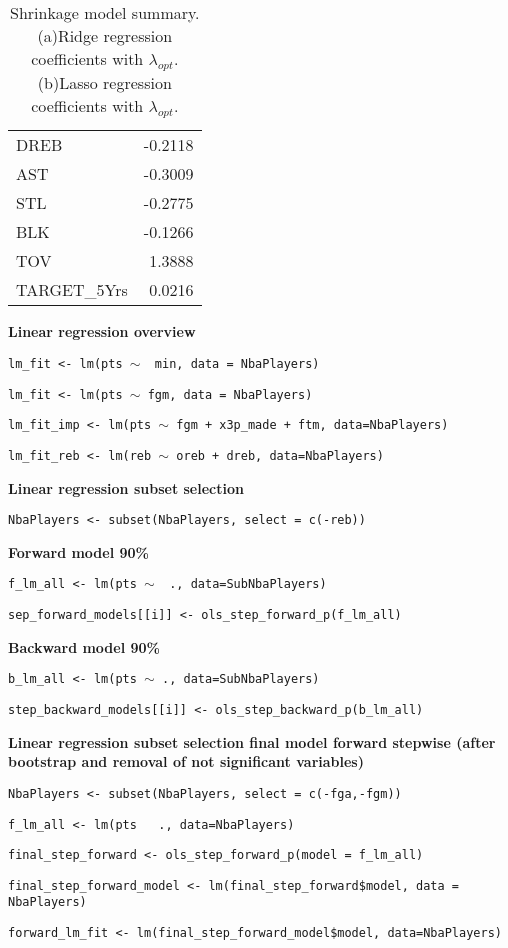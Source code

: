 \begin{table}[H]
\begin{subtable}[h]{0.4\textwidth}
\begin{tabular}{|| l | r ||}
			DREB & -0.2118 \\
			AST & -0.3009 \\
			STL & -0.2775 \\
			BLK & -0.1266 \\
			TOV & 1.3888 \\ 
			TARGET\_5Yrs & 0.0216 \\				
			\hline
		\end{tabular}
		\caption{}
		\label{table:FinalLassoCoef}
	\end{subtable}
	\caption{Shrinkage model summary. (a)Ridge regression coefficients with $\lambda_{opt}$. (b)Lasso regression coefficients with $\lambda_{opt}$.}
	\label{table:RegModSum}
\end{table}

\textbf{Linear regression overview}

\begin{center}
\texttt{lm\_fit <- lm(pts $\sim$~ min, data = NbaPlayers)}

\texttt{lm\_fit <- lm(pts $\sim$ fgm, data = NbaPlayers)}

\texttt{lm\_fit\_imp <- lm(pts $\sim$ fgm + x3p\_made + ftm, data=NbaPlayers)}

\texttt{lm\_fit\_reb <- lm(reb $\sim$ oreb + dreb, data=NbaPlayers)}
\end{center}
	
\noindent
\textbf{Linear regression subset selection}

\begin{center}
\texttt{NbaPlayers <- subset(NbaPlayers, select = c(-reb))}

\textbf{Forward model 90\%}

\texttt{f\_lm\_all <- lm(pts $\sim$~ ., data=SubNbaPlayers)}

\texttt{sep\_forward\_models[[i]] <- ols\_step\_forward\_p(f\_lm\_all)}

\textbf{Backward model 90\%}

\texttt{b\_lm\_all <- lm(pts $\sim$ ., data=SubNbaPlayers)}

\texttt{step\_backward\_models[[i]] <- ols\_step\_backward\_p(b\_lm\_all)}
\end{center}
	
\noindent
\textbf{Linear regression subset selection final model forward stepwise (after bootstrap and removal of not significant variables)}

\begin{center}
\texttt{NbaPlayers <- subset(NbaPlayers, select = c(-fga,-fgm))}

\texttt{f\_lm\_all <- lm(pts ~ ., data=NbaPlayers)}

\texttt{final\_step\_forward <- ols\_step\_forward\_p(model = f\_lm\_all)}

\texttt{final\_step\_forward\_model <- lm(final\_step\_forward\$model, data = NbaPlayers)}

\texttt{forward\_lm\_fit <- lm(final\_step\_forward\_model\$model, data=NbaPlayers)}
\end{center}
	
